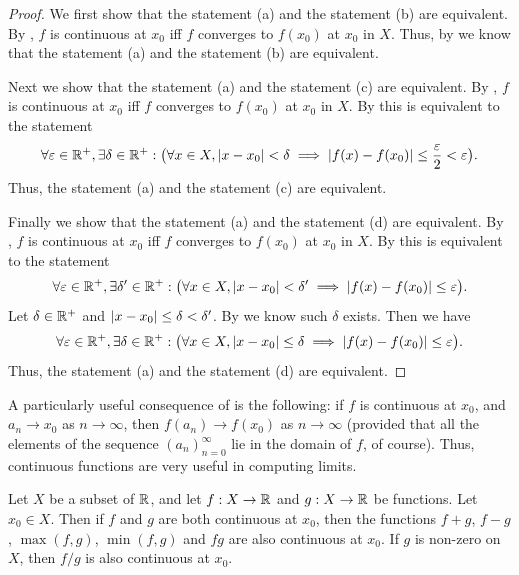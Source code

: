 \begin{proof}
  We first show that the statement (a) and the statement (b) are equivalent.
  By , \(f\) is continuous at \(x_0\) iff \(f\) converges to \(f(x_0)\) at \(x_0\) in \(X\).
  Thus, by  we know that the statement (a) and the statement (b) are equivalent.

  Next we show that the statement (a) and the statement (c) are equivalent.
  By , \(f\) is continuous at \(x_0\) iff \(f\) converges to \(f(x_0)\) at \(x_0\) in \(X\).
  By  this is equivalent to the statement
  \[
    \forall \varepsilon \in \mathbb{R}^+, \exists \delta \in \mathbb{R}^+ : \big(\forall x \in X, \left\lvert x - x_0\right\rvert < \delta \implies \left\lvert f(x) - f(x_0)\right\rvert \leq \dfrac{\varepsilon}{2} < \varepsilon\big).
  \]
  Thus, the statement (a) and the statement (c) are equivalent.

  Finally we show that the statement (a) and the statement (d) are equivalent.
  By , \(f\) is continuous at \(x_0\) iff \(f\) converges to \(f(x_0)\) at \(x_0\) in \(X\).
  By  this is equivalent to the statement
  \[
    \forall \varepsilon \in \mathbb{R}^+, \exists \delta' \in \mathbb{R}^+ : \big(\forall x \in X, \left\lvert x - x_0\right\rvert < \delta' \implies \left\lvert f(x) - f(x_0)\right\rvert \leq \varepsilon\big).
  \]
  Let \(\delta \in \mathbb{R}^+\) and \(\left\lvert x - x_0\right\rvert \leq \delta < \delta'\).
  By  we know such \(\delta\) exists.
  Then we have
  \[
    \forall \varepsilon \in \mathbb{R}^+, \exists \delta \in \mathbb{R}^+ : \big(\forall x \in X, \left\lvert x - x_0\right\rvert \leq \delta \implies \left\lvert f(x) - f(x_0)\right\rvert \leq \varepsilon\big).
  \]
  Thus, the statement (a) and the statement (d) are equivalent.
\end{proof}

\begin{rmk}\label{i:9.4.8}
  A particularly useful consequence of  is the following:
  if \(f\) is continuous at \(x_0\), and \(a_n \to x_0\) as \(n \to \infty\), then \(f(a_n) \to f(x_0)\) as \(n \to \infty\)
  (provided that all the elements of the sequence \((a_n)_{n = 0}^\infty\) lie in the domain of \(f\), of course).
  Thus, continuous functions are very useful in computing limits.
\end{rmk}

\begin{prop}\label{i:9.4.9}
  Let \(X\) be a subset of \(\mathbb{R}\), and let \(f : X \to \mathbb{R}\) and \(g : X \to \mathbb{R}\) be functions.
  Let \(x_0 \in X\).
  Then if \(f\) and \(g\) are both continuous at \(x_0\), then the functions \(f + g\), \(f - g\), \(\max(f, g)\), \(\min(f, g)\) and \(fg\) are also continuous at \(x_0\).
  If \(g\) is non-zero on \(X\), then \(f / g\) is also continuous at \(x_0\).
\end{prop}


